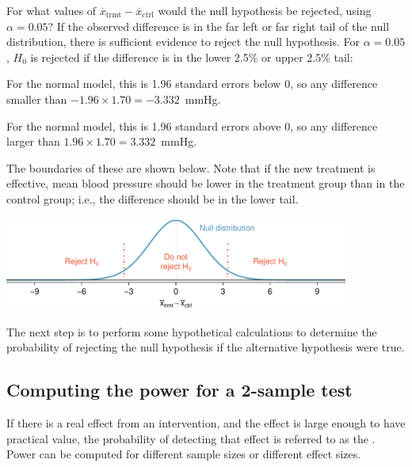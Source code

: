 \begin{examplewrap}
\begin{nexample}{For what values of $\overline{x}_{\text{trmt}} - \overline{x}_{\text{ctrl}}$ would the null hypothesis be rejected, using $\alpha = 0.05$?}
If the observed difference is in the far left or far right tail of the null distribution, there is sufficient evidence to reject the null hypothesis.
For $\alpha = 0.05$, $H_0$ is rejected if the difference is in the lower 2.5\% or upper 2.5\% tail:
\begin{description}
\setlength{\itemsep}{0mm}
\item[Lower 2.5\%:] For the normal model, this is 1.96 standard errors below 0, so any difference smaller than $-1.96 \times 1.70 = -3.332$~mmHg.
\item[Upper 2.5\%:] For the normal model, this is 1.96 standard errors above 0, so any difference larger than $1.96 \times 1.70 = 3.332$~mmHg.
\end{description}
The boundaries of these  are shown below. Note that if the new treatment is effective, mean blood pressure should be lower in the treatment group than in the control group; i.e., the difference should be in the lower tail.
\begin{center}
\includegraphics[width=0.85\textwidth]{ch_inference_for_means_oi_biostat/figures/power_null_0_1-7/power_null_B_0_1-7_with_rejection_region}
\end{center}
\end{nexample}
\end{examplewrap}

The next step is to perform some hypothetical calculations to determine the probability of rejecting the null hypothesis if the alternative hypothesis were true.


\textD{\newpage}


\subsection{Computing the power for a 2-sample test}

If there is a real effect from an intervention, and the effect is large enough to have practical value, the probability of detecting that effect is referred to as the . Power can be computed for different sample sizes or different effect sizes. 

